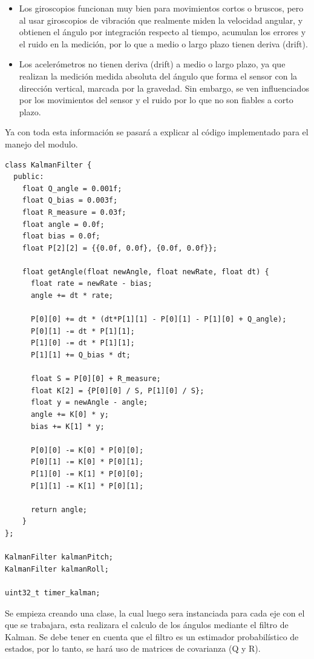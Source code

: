 \documentclass[10pt]{article}
\begin{document}
\begin{itemize}
    \item Los giroscopios funcionan muy bien para movimientos cortos o bruscos, pero al usar giroscopios de vibración que realmente miden la velocidad angular, y obtienen el ángulo por integración respecto al tiempo, acumulan los errores y el ruido en la medición, por lo que a medio o largo plazo tienen deriva (drift).

    \item Los acelerómetros no tienen deriva (drift) a medio o largo plazo, ya que realizan la medición medida absoluta del ángulo que forma el sensor con la dirección vertical, marcada por la gravedad. Sin embargo, se ven influenciados por los movimientos del sensor y el ruido por lo que no son fiables a corto plazo.
\end{itemize}

Ya con toda esta información se pasará a explicar al código implementado para el manejo del modulo.

\begin{lstlisting}
class KalmanFilter {
  public:
    float Q_angle = 0.001f;
    float Q_bias = 0.003f;
    float R_measure = 0.03f;
    float angle = 0.0f;
    float bias = 0.0f;
    float P[2][2] = {{0.0f, 0.0f}, {0.0f, 0.0f}};

    float getAngle(float newAngle, float newRate, float dt) {
      float rate = newRate - bias;
      angle += dt * rate;

      P[0][0] += dt * (dt*P[1][1] - P[0][1] - P[1][0] + Q_angle);
      P[0][1] -= dt * P[1][1];
      P[1][0] -= dt * P[1][1];
      P[1][1] += Q_bias * dt;

      float S = P[0][0] + R_measure;
      float K[2] = {P[0][0] / S, P[1][0] / S};
      float y = newAngle - angle;
      angle += K[0] * y;
      bias += K[1] * y;

      P[0][0] -= K[0] * P[0][0];
      P[0][1] -= K[0] * P[0][1];
      P[1][0] -= K[1] * P[0][0];
      P[1][1] -= K[1] * P[0][1];

      return angle;
    }
};

KalmanFilter kalmanPitch;
KalmanFilter kalmanRoll;

uint32_t timer_kalman;
\end{lstlisting}

Se empieza creando una clase, la cual luego sera instanciada para cada eje con el que se trabajara, esta realizara el calculo de los ángulos mediante el filtro de Kalman. Se debe tener en cuenta que el filtro es un estimador probabilístico de estados, por lo tanto, se hará uso de matrices de covarianza (Q y R). 
\end{document}

